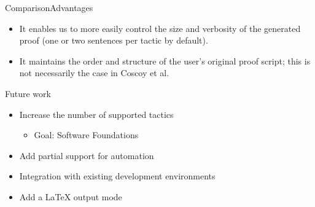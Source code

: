\documentclass[pdf]{beamer}
\begin{document}
\begin{frame}{Comparison}{Advantages}
    \begin{itemize}
        \item{It enables us to more easily control the size and verbosity of the generated proof (one or two sentences per tactic by default).}
        \item{It maintains the order and structure of the user's original proof script; this is not necessarily the case in Coscoy et al. }
      \end{itemize}
\end{frame}

\begin{frame}{Future work}
    \begin{itemize}
        \item Increase the number of supported tactics
        \begin{itemize}
            \item Goal: Software Foundations
        \end{itemize}
        \item Add partial support for automation
        \item Integration with existing development environments
        \item Add a LaTeX output mode
    \end{itemize}
\end{frame}
\end{document}
